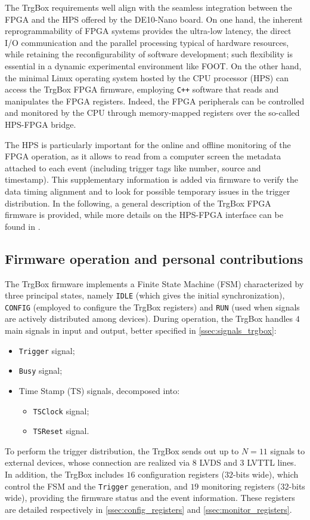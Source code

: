 The TrgBox requirements well align with the seamless integration between the FPGA and the HPS offered by the DE10-Nano board. On one hand, the inherent reprogrammability of FPGA systems provides the ultra-low latency, the direct I/O communication and the parallel processing typical of hardware resources, while retaining the reconfigurability of software development; such flexibility is essential in a dynamic experimental environment like FOOT. On the other hand, the minimal Linux operating system hosted by the CPU processor (HPS) can access the TrgBox FPGA firmware, employing \texttt{C++} software that reads and manipulates the FPGA registers. Indeed, the FPGA peripherals can be controlled and monitored by the CPU through memory-mapped registers over the so-called HPS-FPGA bridge.

The HPS is particularly important for the online and offline monitoring of the FPGA operation, as it allows to read from a computer screen the metadata attached to each event (including trigger tags like number, source and timestamp). This supplementary information is added via firmware to verify the data timing alignment and to look for possible temporary issues in the trigger distribution. In the following, a general description of the TrgBox FPGA firmware is provided, while more details on the HPS-FPGA interface can be found in \cite{thesisSavarese}.
\subsection{Firmware operation and personal contributions}\label{ssec:firmware_operation_signals_pers_contr}
The TrgBox firmware implements a Finite State Machine (FSM) characterized by three principal states, namely \texttt{IDLE} (which gives the initial synchronization), \texttt{CONFIG} (employed to configure the TrgBox registers) and \texttt{RUN} (used when signals are actively distributed among devices). During operation, the TrgBox handles $4$ main signals in input and output, better specified in \autoref{ssec:signals_trgbox}:
\begin{itemize}
	\item \texttt{Trigger} signal;
	\item \texttt{Busy} signal;
	\item Time Stamp (TS) signals, decomposed into:
	\begin{itemize}
		\item \texttt{TSClock} signal;
		\item \texttt{TSReset} signal.
	\end{itemize}
\end{itemize}
To perform the trigger distribution, the TrgBox sends out up to $N=11$ signals to external devices, whose connection are realized via $8$ LVDS and $3$ LVTTL lines. In addition, the TrgBox includes $16$ configuration registers ($32$-bits wide), which control the FSM and the \texttt{Trigger} generation, and $19$ monitoring registers ($32$-bits wide), providing the firmware status and the event information. These registers are detailed respectively in \autoref{ssec:config_registers} and \autoref{ssec:monitor_registers}.

